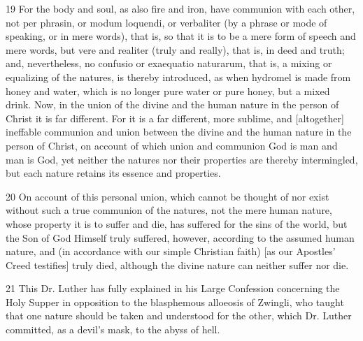 19 For the body and soul, as also fire and iron, have communion with each other, not per phrasin, or modum loquendi, or verbaliter (by a phrase or mode of speaking, or in mere words), that is, so that it is to be a mere form of speech and mere words, but vere and realiter (truly and really), that is, in deed and truth; and, nevertheless, no confusio or exaequatio naturarum, that is, a mixing or equalizing of the natures, is thereby introduced, as when hydromel is made from honey and water, which is no longer pure water or pure honey, but a mixed drink. Now, in the union of the divine and the human nature in the person of Christ it is far different. For it is a far different, more sublime, and [altogether] ineffable communion and union between the divine and the human nature in the person of Christ, on account of which union and communion God is man and man is God, yet neither the natures nor their properties are thereby intermingled, but each nature retains its essence and properties.

20 On account of this personal union, which cannot be thought of nor exist without such a true communion of the natures, not the mere human nature, whose property it is to suffer and die, has suffered for the sins of the world, but the Son of God Himself truly suffered, however, according to the assumed human nature, and (in accordance with our simple Christian faith) [as our Apostles’ Creed testifies] truly died, although the divine nature can neither suffer nor die.

21 This Dr. Luther has fully explained in his Large Confession concerning the Holy Supper in opposition to the blasphemous alloeosis of Zwingli, who taught that one nature should be taken and understood for the other, which Dr. Luther committed, as a devil’s mask, to the abyss of hell.

